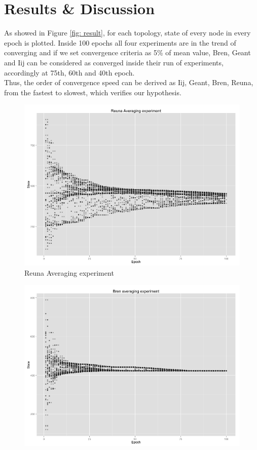 \section{Results \& Discussion}
As showed in Figure \ref{fig: result}, for each topology, state of every node in every epoch is plotted. Inside 100 epochs all four experiments are in the trend of converging and if we set convergence criteria as 5\% of mean value, Bren, Geant and Iij can be considered as converged inside their run of experiments, accordingly at 75th, 60th and 40th epoch.\\
Thus, the order of convergence speed can be derived as Iij, Geant, Bren, Reuna, from the fastest to slowest, which verifies our hypothesis.
\begin{figure}[h!]
	\centering
    \begin{minipage}[t]{0.47\textwidth}
    \includegraphics[width=\linewidth]{figures/Reuna Averaging experiment.png}
    Reuna Averaging experiment
    \end{minipage}
    \begin{minipage}[t]{0.47\textwidth}
    \vspace{0pt}
    \includegraphics[width=\linewidth]{figures/bren_exp_avg.png}

\end{minipage}
\end{figure}
